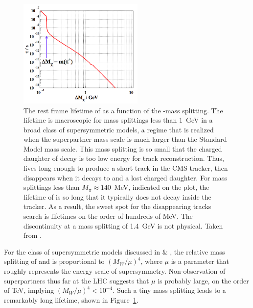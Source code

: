   \begin{figure}[htbp]
    \centering
    \includegraphics[width=0.55\textwidth]{figures/chargino_lifetime.png}
    \caption[Lifetime of \chargino as a function of mass splitting.]{
      The rest frame lifetime of \chargino as a function of the \chargino-\lsp mass splitting. 
      The lifetime is macroscopic for mass splittings less than 1~GeV in a broad class of supersymmetric models, a regime that is realized  when the superpartner mass scale is much larger than the Standard Model mass scale. 
      This mass splitting is so small that the charged daughter of \chargino decay is too low energy for track reconstruction.
      Thus, \chargino lives long enough to produce a short track in the CMS tracker, then disappears when it decays to \lsp and a lost charged daughter.
      For mass splittings less than $M_{\pi} \approx 140$~MeV, indicated on the plot, the lifetime of \chargino is so long that it typically does not decay inside the tracker.
      As a result, the sweet spot for the disappearing tracks search is lifetimes on the order of hundreds of MeV.
      The discontinuity at a mass splitting of 1.4~GeV is not physical.
      Taken from \cite{AMSBlifetime}.}
    \label{fig:charginolifetime}
  \end{figure}

  For the class of supersymmetric models discussed in \cite{distracksAMSB} \& \cite{AMSBlifetime}, the relative mass splitting of \chargino and \lsp is proportional to $(M_{W}/\mu)^4$, where $\mu$ is a parameter that roughly represents the energy scale of supersymmetry.
  Non-observation of superpartners thus far at the LHC suggests that $\mu$ is probably large, on the order of TeV, implying $(M_{W}/\mu)^4 < 10^{-4}$.
  Such a tiny mass splitting leads to a remarkably long \chargino lifetime, shown in Figure~\ref{fig:charginolifetime}.

